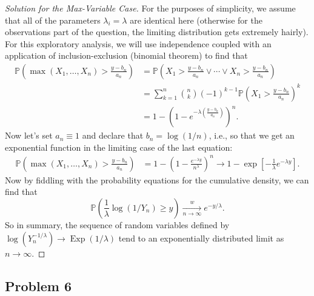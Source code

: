 \documentclass[12pt,reqno]{article}
\theoremstyle{plain}
\theoremstyle{definition}
\newcommand{\PP}[1]{\ensuremath{\mathbb{P}\left(#1\right)}}
\begin{document}
\begin{proof}[Solution for the Max-Variable Case]
For the purposes of simplicity, we assume that all of the parameters 
$\lambda_i = \lambda$ are identical here (otherwise for the observations 
part of the question, the limiting distribution gets extremely hairly). 
For this exploratory analysis, we will use independence coupled with an 
application of inclusion-exclusion (binomial theorem) to find that 
\begin{align*} 
\PP{\max(X_1,\ldots,X_n) > \frac{y-b_n}{a_n}} & = 
     \PP{X_1 > \frac{y-b_n}{a_n} \vee \cdots \vee X_n > \frac{y-b_n}{a_n}} \\ 
     & = \sum_{k=1}^n \binom{n}{k} (-1)^{k-1} 
     \PP{X_1 > \frac{y-b_n}{a_n}}^{k} \\ 
     & = 1 - \left(1-e^{-\lambda \left(\frac{y-b_n}{a_n}\right)}\right)^{n}. 
\end{align*} 
Now let's set $a_n \equiv 1$ and declare that $b_n = \log(1/n)$, i.e., so 
that we get an exponential function in the limiting case of the last 
equation:
\begin{align*} 
\PP{\max(X_1,\ldots,X_n) > \frac{y-b_n}{a_n}} & = 
1-\left(1-\frac{e^{-\lambda y}}{n^{\lambda}}\right)^{n} \longrightarrow 
     1 - \exp\left[-\frac{1}{\lambda} e^{-\lambda y}\right]. 
\end{align*} 
Now by fiddling with the probability equations for the cumulative 
density, we can find that 
\[
\PP{\frac{1}{\lambda} \log(1 / Y_n) \geq y} 
     \xrightarrow[n \rightarrow \infty]{w} e^{-y / \lambda}. 
\]
So in summary, the sequence of random variables defined by 
$\log(Y_n^{-1/\lambda}) \rightarrow \operatorname{Exp}(1/\lambda)$ 
tend to an exponentially distributed limit as $n \rightarrow \infty$. 
\end{proof} 

\subsection{Problem 6}
\end{document}
